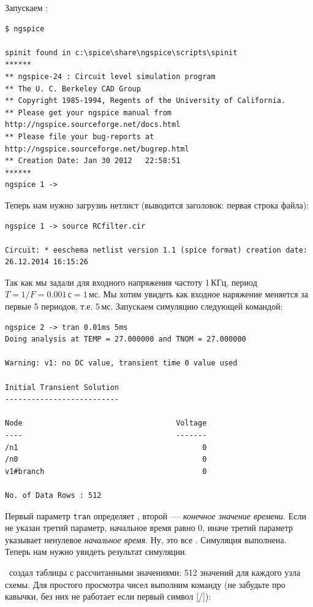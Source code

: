 Запускаем \ngs:

\begin{verbatim}
$ ngspice

spinit found in c:\spice\share\ngspice\scripts\spinit
******
** ngspice-24 : Circuit level simulation program
** The U. C. Berkeley CAD Group
** Copyright 1985-1994, Regents of the University of California.
** Please get your ngspice manual from http://ngspice.sourceforge.net/docs.html
** Please file your bug-reports at http://ngspice.sourceforge.net/bugrep.html
** Creation Date: Jan 30 2012   22:58:51
******
ngspice 1 -> 
\end{verbatim}

Теперь нам нужно загрузиь нетлист (выводится заголовок: первая строка файла):

\begin{verbatim}
ngspice 1 -> source RCfilter.cir

Circuit: * eeschema netlist version 1.1 (spice format) creation date: 26.12.2014 16:15:26
\end{verbatim}

Так как мы задали для входного напряжения частоту 1\,КГц, период
$T=1/F=0.001$\,с$=1$\,мс.
Мы хотим увидеть как входное наряжение меняется за первые 5 периодов, т.е.
5\,мс. Запускаем симуляцию следующей командой:

\begin{verbatim}
ngspice 2 -> tran 0.01ms 5ms
Doing analysis at TEMP = 27.000000 and TNOM = 27.000000

Warning: v1: no DC value, transient time 0 value used

Initial Transient Solution
--------------------------

Node                                   Voltage
----                                   -------
/n1                                          0
/n0                                          0
v1#branch                                    0

No. of Data Rows : 512
\end{verbatim}

Первый параметр \verb|tran| определяет , второй\ ---
\emph{конечное значение времени}. Если не указан третий параметр,
начальное время равно 0, иначе третий параметр указывает ненулевое
\emph{начальное время}. Ну, это все \smiley. Симуляция выполнена. Теперь нам
нужно увидеть результат симуляции.


\spice\ создал таблицы с рассчитанными значениями: 512 значений для каждого узла
схемы. Для простого просмотра чисел выполним команду (не забудьте про кавычки,
без них не работает если первый символ [/]):


